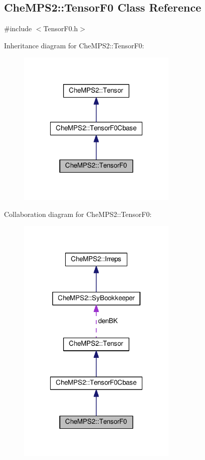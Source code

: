 \hypertarget{classCheMPS2_1_1TensorF0}{\subsection{Che\-M\-P\-S2\-:\-:Tensor\-F0 Class Reference}
\label{classCheMPS2_1_1TensorF0}
}


{\ttfamily \#include $<$Tensor\-F0.\-h$>$}



Inheritance diagram for Che\-M\-P\-S2\-:\-:Tensor\-F0\-:\nopagebreak
\begin{figure}[H]
\begin{center}
\leavevmode
\includegraphics[width=216pt]{classCheMPS2_1_1TensorF0__inherit__graph}
\end{center}
\end{figure}


Collaboration diagram for Che\-M\-P\-S2\-:\-:Tensor\-F0\-:\nopagebreak
\begin{figure}[H]
\begin{center}
\leavevmode
\includegraphics[width=216pt]{classCheMPS2_1_1TensorF0__coll__graph}
\end{center}
\end{figure}
